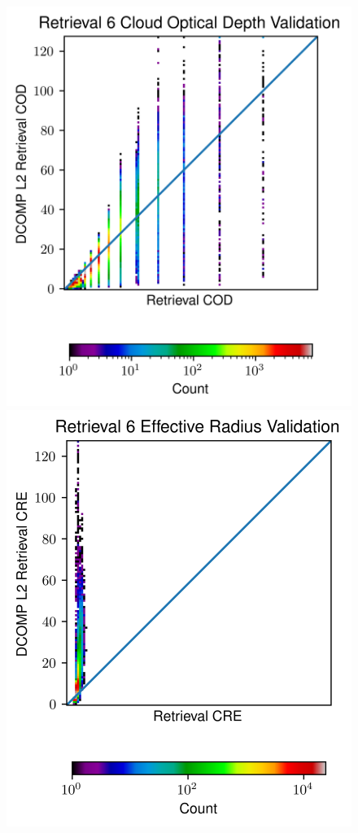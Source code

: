 \documentclass[12pt]{article}
\begin{document}
\begin{figure}[h!]
\begin{center}
{            \includegraphics[width=.32\paperwidth]{figs/val_ret6_cod.png}
            \includegraphics[width=.30\paperwidth]{figs/val_ret6_cre.png}
}
\end{center}
\end{figure}
\end{document}

